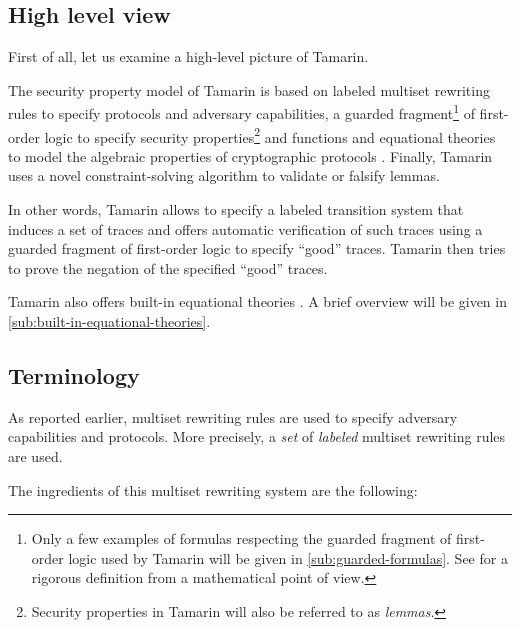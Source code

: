 \subsection{High level view}
First of all, let us examine a high-level picture of Tamarin.

The security property model of Tamarin is based on labeled multiset rewriting rules to specify protocols and adversary capabilities, a guarded fragment\footnote{Only a few examples of formulas respecting the guarded fragment of first-order logic used by Tamarin will be given in \cref{sub:guarded-formulas}. See \cite{FragmentFirstOrderLogicPaper} for a rigorous definition from a mathematical point of view.} of first-order logic to specify security properties\footnote{Security properties in Tamarin will also be referred to as \textit{lemmas}.} and functions and equational theories to model the algebraic properties of cryptographic protocols \cite{TamarinFoundations}.
Finally, Tamarin uses a novel constraint-solving algorithm to validate or falsify lemmas.

In other words, Tamarin allows to specify a labeled transition system that induces a set of traces and offers automatic verification of such traces using a guarded fragment of first-order logic to specify ``good'' traces. Tamarin then tries to prove the negation of the specified ``good'' traces.

Tamarin also offers built-in equational theories \cite{TamarinProverManual}. A brief overview will be given in \cref{sub:built-in-equational-theories}.

\subsection{Terminology}
\label{subsec:tamarin-foundations-terminology}
As reported earlier, multiset rewriting rules are used to specify adversary capabilities and protocols. More precisely, a \textit{set} of \textit{labeled} multiset rewriting rules are used.

The ingredients of this multiset rewriting system are the following:

